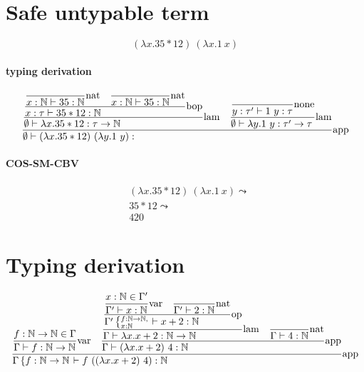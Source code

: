 \documentclass{article}
\newcommand{\st}[3][]{\ensuremath{\displaystyle\frac{#3\hfill}{#2\hfill} \text{#1}}}
\newcommand{\N}{\ensuremath \mathbb N}
\newcommand{\lam}[2]{\ensuremath{\lambda#1.#2}}
\begin{document}
\section{Safe untypable term}
\begin{equation*}
    (\lam{x}{35*12})\ (\lam{x}{1\ x})
\end{equation*}

\paragraph{typing derivation}
\begin{align*}
    \st[app]{
        \emptyset\vdash (\lam{x}{35*12})\ (\lam{y}{1\ y}): 
    }{
        \st[lam]{
            \emptyset\vdash \lam{x}{35*12}:\tau\to\N
        }{
            \st[bop]{
                x:\tau\vdash 35*12:\N
            }{
                \st[nat]{
                    x:\N\vdash 35:\N
                }{}
                \quad
                \st[nat]{
                    x:\N\vdash 35:\N
                }{}
            }
        }
        \quad
        \st[lam]{
            \emptyset\vdash \lam{y}{1\ y}: \tau'\to\tau
        }{
            \st[none]{
                y:\tau'\vdash 1\ y: \tau
            }{}
        }
    }
\end{align*}

\paragraph{COS-SM-CBV}
\begin{align*}
    & (\lam{x}{35*12})\ (\lam{x}{1\ x}) \leadsto \\
    & 35*12 \leadsto \\
    & 420
\end{align*}

\section{Typing derivation}
\begin{equation*}
    \st[app]{
        \Gamma\left\{f:\N\to\N\right. \vdash f\ ((\lam{x}{x+2})\ 4): \N
    }{
        \st[var]{
            \Gamma \vdash f:\N\to\N
        }{
            f:\N\to\N \in \Gamma
        }
        \quad
        \st[app]{
            \Gamma\vdash (\lam{x}{x+2})\ 4: \N
        }{
            \st[lam]{
                \Gamma\vdash \lam{x}{x+2}:\N\to\N
            }{
                \st[op]{
                    \Gamma'\left\{\substack{f:\N\to\N\hfill,\\x:\N\hfill}\right.\vdash x+2:\N
                }{
                    \st[var]{
                        \Gamma'\vdash x:\N
                    }{
                        x:\N\in\Gamma'
                    }
                    \quad
                    \st[nat]{
                        \Gamma'\vdash 2:\N
                    }{
                    }
                }
            }
            \quad
            \st[nat]{
                \Gamma\vdash 4:\N
            }{}
        }
    }
\end{equation*}
\end{document}
